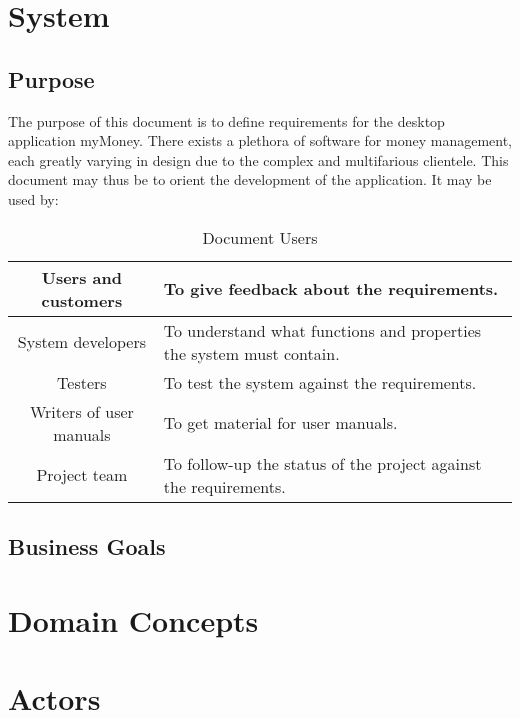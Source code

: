 \tableofcontents
\listoffigures
\listoftables

\clearpage

\section{System}\subsection{Purpose}

The purpose of this document is to define requirements for the  desktop application myMoney.
There exists a plethora of software for money management, each greatly varying in design due to the complex and multifarious clientele. This document may thus be to orient the development of the application. It may be used by:

\begin{table}[htbp]
\caption{Document Users}
\begin{center}
\begin{tabular}{|c|p{10cm}|}
\hline
Users and customers       & To give feedback about the requirements. \\
\hline
System developers         & To understand what functions and properties the system must contain. \\
\hline
Testers                   & To test the system against the requirements. \\
\hline
Writers of user manuals   & To get material for user manuals. \\
\hline
Project team              & To follow-up the status of the project against the requirements. \\
\hline
\end{tabular}
\end{center}
\end{table}


\subsection{Business Goals}

\section{Domain Concepts}

\section{Actors}

